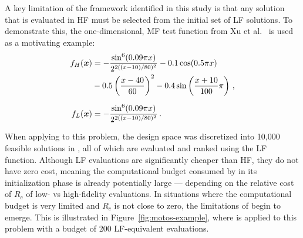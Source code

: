 A key limitation of the \motos{} framework identified in this study is that any solution that is evaluated in HF must be selected from the initial set of LF solutions. To demonstrate this, the one-dimensional, MF test function from Xu et al.~\cite{xu2016mo2tos} is used as a motivating example:%
\begin{align}
f_H(\boldsymbol{x}) &= -\frac{\sin^6(0.09\pi x)}{2^{2((x-10)/80)^2}}-0.1\cos(0.5\pi x)\nonumber\\
           &-0.5\left(\frac{x-40}{60}\right)^2- 0.4\sin\left(\frac{x+10}{100}\pi\right)\,,\label{eq:hf-ex}\\[0.2cm]
f_L(\boldsymbol{x}) &= -\frac{\sin^6(0.09\pi x)}{2^{2((x-10)/80)^2}}\,. \label{eq:lf-ex}
\end{align}

When applying \motos{} to this problem, the design space was discretized into 10,000 feasible solutions in \cite{xu2016mo2tos}, all of which are evaluated and ranked using the LF function. Although LF evaluations are significantly cheaper than HF, they do not have zero cost, meaning the computational budget consumed by \motos{} in its initialization phase is already potentially large --- depending on the relative cost of $R_c$ of low- vs high-fidelity evaluations. In situations where the computational budget is very limited and $R_c$ is not close to zero, the limitations of \motos{} begin to emerge. This is illustrated in Figure~\ref{fig:motos-example}, where \motos{} is applied to this problem with a budget of 200 LF-equivalent evaluations. %


